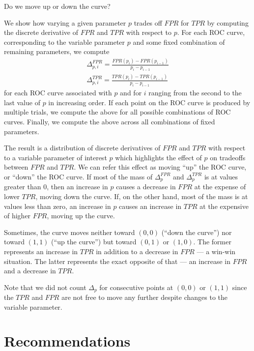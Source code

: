 Do we move up or down the curve?

We show how varying a given parameter $p$ trades off $FPR$ for $TPR$ by
computing the discrete derivative of $FPR$ and $TPR$ with respect to $p$. For
each ROC curve, corresponding to the variable parameter $p$ and some fixed
combination of remaining parameters, we compute
\begin{gather}
\Delta_{p,i}^{FPR} = \frac{FPR(p_{i}) - FPR(p_{i-1})}{p_i - p_{i-1}}\\
\Delta_{p,i}^{TPR} = \frac{TPR(p_{i}) - TPR(p_{i-1})}{p_i - p_{i-1}}
\end{gather}
for each ROC curve associated with $p$ and for $i$ ranging from the second to the last value
of $p$ in increasing order. If each point on the ROC curve is produced by
multiple trials, we compute the above for all possible combinations of ROC
curves. Finally, we compute the above across all combinations of fixed
parameters.

The result is a distribution of discrete derivatives of $FPR$ and $TPR$ with
respect to a variable parameter of interest $p$ which highlights the effect of
$p$ on tradeoffs between $FPR$ and $TPR$. We can refer this effect as moving
``up'' the ROC curve, or ``down'' the ROC curve. If most of the mass of
$\Delta_{p}^{FPR}$ and $\Delta_{p}^{TPR}$ is at values greater than 0, then an
increase in $p$ causes a decrease in $FPR$ at the expense of lower $TPR$, moving
down the curve. If, on the other hand, most of the mass is at values less than
zero, an increase in $p$ causes an increase in $TPR$ at the expensive of higher
$FPR$, moving up the curve.

Sometimes, the curve moves neither toward $(0,0)$ (``down the curve'') nor
toward $(1,1)$ (``up the curve'') but toward $(0,1)$ or $(1,0)$. The former
represents an increase in $TPR$ in addition to a decrease in $FPR$ --- a win-win
situation. The latter represents the exact opposite of that --- an increase in
$FPR$ and a decrease in $TPR$.

Note that we did not count $\Delta_p$ for consecutive points at $(0,0)$ or
$(1,1)$ since the $TPR$ and $FPR$ are not free to move any further despite
changes to the variable parameter.



\section{Recommendations}
